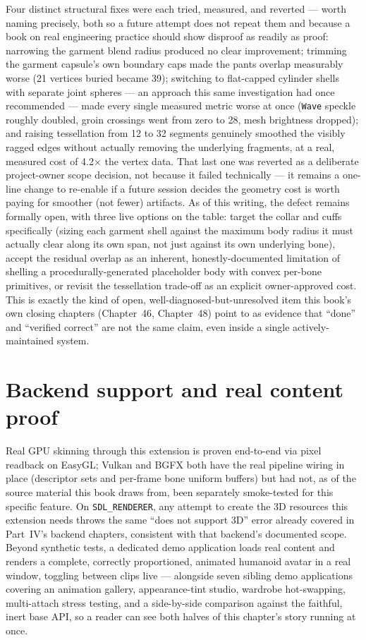 Four distinct structural fixes were each tried, measured, and reverted --- worth naming
precisely, both so a future attempt does not repeat them and because a book on real engineering
practice should show disproof as readily as proof: narrowing the garment blend radius produced
no clear improvement; trimming the garment capsule's own boundary caps made the pants overlap
measurably worse (21 vertices buried became 39); switching to flat-capped cylinder shells with
separate joint spheres --- an approach this same investigation had once recommended --- made
every single measured metric worse at once (\texttt{Wave} speckle roughly doubled, groin
crossings went from zero to 28, mesh brightness dropped); and raising tessellation from 12 to
32 segments genuinely smoothed the visibly ragged edges without actually removing the
underlying fragments, at a real, measured cost of 4.2$\times$ the vertex data. That last one
was reverted as a deliberate project-owner scope decision, not because it failed technically ---
it remains a one-line change to re-enable if a future session decides the geometry cost is
worth paying for smoother (not fewer) artifacts. As of this writing, the defect remains
formally open, with three live options on the table: target the collar and cuffs specifically
(sizing each garment shell against the maximum body radius it must actually clear along its
own span, not just against its own underlying bone), accept the residual overlap as an
inherent, honestly-documented limitation of shelling a procedurally-generated placeholder body
with convex per-bone primitives, or revisit the tessellation trade-off as an explicit
owner-approved cost. This is exactly the kind of open, well-diagnosed-but-unresolved item this
book's own closing chapters (Chapter~46, Chapter~48) point to as evidence that ``done'' and
``verified correct'' are not the same claim, even inside a single actively-maintained system.

\section{Backend support and real content proof}

Real GPU skinning through this extension is proven end-to-end via pixel readback on EasyGL;
Vulkan and BGFX both have the real pipeline wiring in place (descriptor sets and per-frame
bone uniform buffers) but had not, as of the source material this book draws from, been
separately smoke-tested for this specific feature. On \texttt{SDL\_RENDERER}, any attempt to
create the 3D resources this extension needs throws the same ``does not support 3D'' error
already covered in Part~IV's backend chapters, consistent with that backend's documented
scope. Beyond synthetic tests, a dedicated demo application loads real content and renders a
complete, correctly proportioned, animated humanoid avatar in a real window, toggling between
clips live --- alongside seven sibling demo applications covering an animation gallery,
appearance-tint studio, wardrobe hot-swapping, multi-attach stress testing, and a
side-by-side comparison against the faithful, inert base API, so a reader can see both halves
of this chapter's story running at once.


